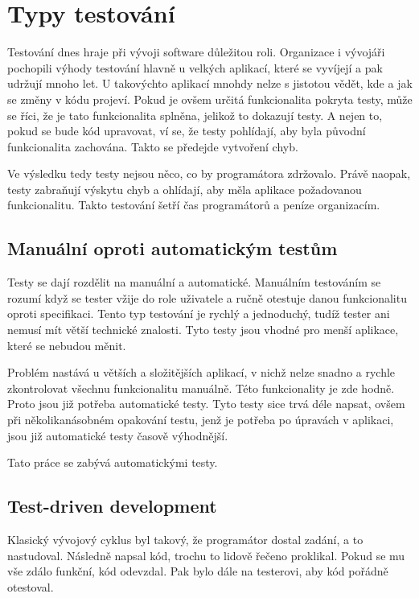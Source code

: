 \documentclass[czech,master,public,dept460,male,cpdeclaration,twoside]{diploma}
\begin{document}
\section{Typy testování}

Testování dnes hraje při vývoji software důležitou roli. Organizace i vývojáři pochopili výhody testování hlavně u velkých aplikací, které se vyvíjejí a pak udržují mnoho let. U takovýchto aplikací mnohdy nelze s jistotou vědět, kde a jak se změny v kódu projeví. Pokud je ovšem určitá funkcionalita pokryta testy, může se říci, že je tato funkcionalita splněna, jelikož to dokazují testy. A nejen to, pokud se bude kód upravovat, ví se, že testy pohlídají, aby byla původní funkcionalita zachována. Takto se předejde vytvoření chyb.

Ve výsledku tedy testy nejsou něco, co by programátora zdržovalo. Právě naopak, testy zabraňují výskytu chyb a ohlídají, aby měla aplikace požadovanou funkcionalitu. Takto testování šetří čas programátorů a peníze organizacím.

\subsection{Manuální oproti automatickým testům}
Testy se dají rozdělit na manuální a automatické. Manuálním testováním se rozumí když se tester vžije do role uživatele a ručně otestuje danou funkcionalitu oproti specifikaci. Tento typ testování je rychlý a jednoduchý, tudíž tester ani nemusí mít větší technické znalosti. Tyto testy jsou vhodné pro menší aplikace, které se nebudou měnit.

Problém nastává u větších a složitějších aplikací, v nichž nelze snadno a rychle zkontrolovat všechnu funkcionalitu manuálně. Této funkcionality je zde hodně. Proto jsou již potřeba automatické testy. Tyto testy sice trvá déle napsat, ovšem při několikanásobném opakování testu, jenž je potřeba po úpravách v aplikaci, jsou již automatické testy časově výhodnější.

Tato práce se zabývá automatickými testy.

\subsection{Test-driven development}
Klasický vývojový cyklus byl takový, že programátor dostal zadání, a to nastudoval. Následně napsal kód, trochu to lidově řečeno proklikal. Pokud se mu vše zdálo funkční, kód odevzdal. Pak bylo dále na testerovi, aby kód pořádně otestoval.
\end{document}
